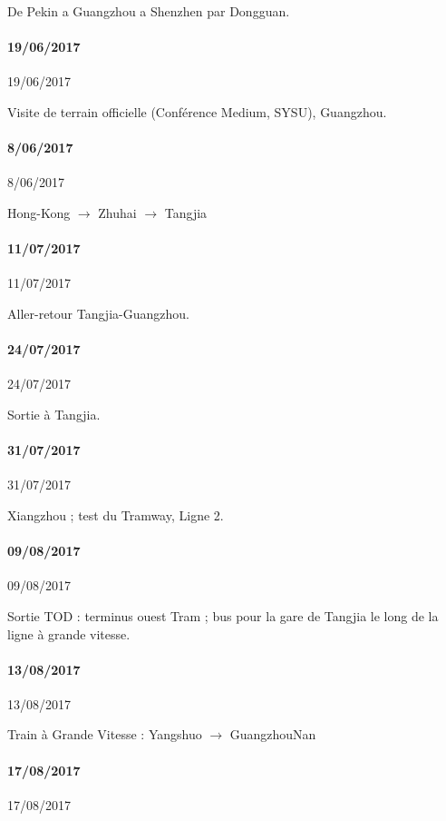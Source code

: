 De Pekin a Guangzhou a Shenzhen par Dongguan.

\paragraph{19/06/2017}{19/06/2017}

Visite de terrain officielle (Conférence Medium, SYSU), Guangzhou.

\paragraph{8/06/2017}{8/06/2017}

Hong-Kong $\rightarrow$ Zhuhai $\rightarrow$ Tangjia


\paragraph{11/07/2017}{11/07/2017}

Aller-retour Tangjia-Guangzhou.


\paragraph{24/07/2017}{24/07/2017}


Sortie à Tangjia.


\paragraph{31/07/2017}{31/07/2017}

Xiangzhou ; test du Tramway, Ligne 2.



\paragraph{09/08/2017}{09/08/2017}

Sortie TOD : terminus ouest Tram ; bus pour la gare de Tangjia le long de la ligne à grande vitesse.


\paragraph{13/08/2017}{13/08/2017}

Train à Grande Vitesse : Yangshuo $\rightarrow$ GuangzhouNan




\paragraph{17/08/2017}{17/08/2017}


